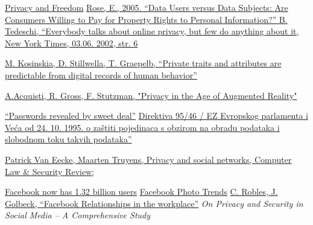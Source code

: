 \documentclass[a4paper]{article}
\begin{document}
\iffalse
 

\fi

\begin{thebibliography}{11}

 \href{https://scholarlycommons.law.wlu.edu/wlulr/vol25/iss1/20/}{Privacy and Freedom}
 \href{https://ieeexplore.ieee.org/document/1385600}{ Rose, E., 2005. “Data Users versus Data Subjects: Are Consumers
Willing to Pay for Property Rights to Personal Information?”
}
 \href{https://www.nytimes.com/2002/06/03/business/e-commerce-report-everybody-talks-about-online-privacy-but-few-anything-about-it.html}{B. Tedeschi, “Everybody talks about online privacy, but few do anything
about it, New York Times, 03.06. 2002, str. 6}

\href{https://www.pnas.org/doi/10.1073/pnas.1218772110}
{M. Kosinskia, D. Stillwella, T. Graepelb, “Private traits and attributes are predictable from digital records of human behavior”}


\href{https://www.heinz.cmu.edu/~acquisti/papers/AcquistiGrossStutzman-JPC-2014.pdf}
{A.Acquisti, R. Gross, F. Stutzman, "Privacy in the Age of Augmented Reality"}


 \href{http://news.bbc.co.uk/2/hi/technology/3639679.stm}{“Passwords revealed by sweet deal”}
 \href{https://eur-lex.europa.eu/legal-content/EN/TXT/HTML/?uri=CELEX:31995L0046&from=en}{Direktiva 95/46 / EZ Evropskog parlamenta i Veća od 24. 10. 1995. o
zaštiti pojedinaca s obzirom na obradu podataka i slobodnom
toku takvih podataka”}

 \href{https://www.sciencedirect.com/science/article/abs/pii/S0267364910001093}{Patrick Van Eecke, Maarten Truyens, Privacy and social networks, Computer Law \& Security Review;}




 \href{https://www.dailymail.co.uk/sciencetech/article-2703440/Theres-no-escape-Facebook-set-record-stock-high-results-beats-expectations-1-32-BILLION-users-30-mobile.html}{Facebook now has 1.32 billion users}
 \href{http://blog.pixable.com//2011/02/14/facebook-photo-trends-inphographic}{Facebook Photo Trends}
 \href{https://ischool.umd.edu/wp-content/uploads/tenure-cv-Jennifer-Ann-Golbeck.pdf}{C. Robles, J. Golbeck, “Facebook Relationships in the workplace”}
 \emph{On Privacy and Security in Social Media – A Comprehensive Study}

\end{thebibliography}
\end{document}

